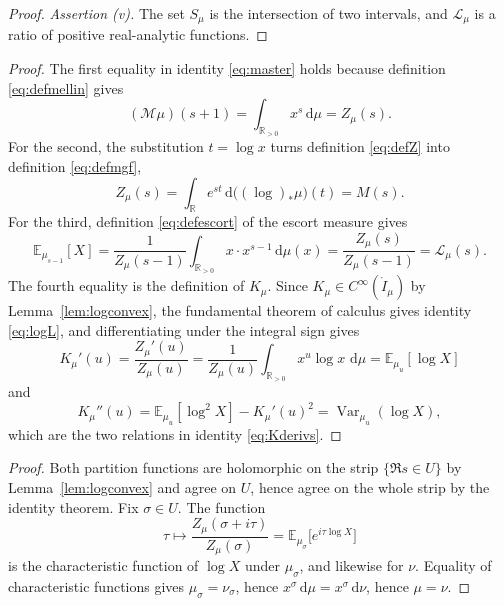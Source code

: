 \documentclass[sn-mathphys-num]{sn-jnl}
\theoremstyle{thmstyleone}%
\theoremstyle{thmstyletwo}%
\theoremstyle{thmstylethree}%
\theoremstyle{thmstyleone}%
\providecommand{\R}{\mathbb{R}}
\providecommand{\E}{\mathbb{E}}
\providecommand{\Var}{\operatorname{Var}}
\providecommand{\Rpos}{\mathbb{R}_{>0}}
\providecommand{\Leh}{\mathscr{L}}
\providecommand{\Mellin}{\mathcal{M}}
\providecommand{\dd}{\,\mathrm{d}}
\begin{document}
\begin{appendices}
\begin{proof}
			\emph{Assertion (v).} The set $S_\mu$ is the intersection of two
			intervals, and $\Leh_\mu$ is a ratio of positive real-analytic
			functions.
		\end{proof}
		\propmaster*
		
		\begin{proof}
			The first equality in identity \eqref{eq:master} holds because
			definition \eqref{eq:defmellin} gives
			\begin{equation}\label{eq:mellinshift}
				(\Mellin\mu)(s+1)=\int_{\Rpos}x^{s}\dd\mu=Z_\mu(s).
			\end{equation}
			For the second, the substitution $t=\log x$ turns
			definition \eqref{eq:defZ} into definition \eqref{eq:defmgf},
			\begin{equation}\label{eq:logpush}
				Z_\mu(s)=\int_{\R}e^{st}\dd\bigl((\log)_*\mu\bigr)(t)=M(s).
			\end{equation}
			For the third, definition \eqref{eq:defescort} of the escort
			measure gives
			\begin{equation}\label{eq:escortmean}
				\E_{\mu_{s-1}}[X]
				=\frac{1}{Z_\mu(s-1)}\int_{\Rpos}x\cdot x^{s-1}\dd\mu(x)
				=\frac{Z_\mu(s)}{Z_\mu(s-1)}=\Leh_\mu(s).
			\end{equation}
			The fourth equality is the definition of $K_\mu$. Since
			$K_\mu\in C^\infty(\mathring I_\mu)$ by
			Lemma~\ref{lem:logconvex}, the fundamental theorem of calculus
			gives identity \eqref{eq:logL}, and differentiating under the
			integral sign gives
			\begin{equation}\label{eq:Kprime}
				K_\mu'(u)=\frac{Z_\mu'(u)}{Z_\mu(u)}
				=\frac{1}{Z_\mu(u)}\int_{\Rpos} x^{u}\log x\,\dd\mu
				=\E_{\mu_u}[\log X]
			\end{equation}
			and
			\begin{equation}\label{eq:Kdoubleprime}
				K_\mu''(u)=\E_{\mu_u}[\log^2X]-K_\mu'(u)^2
				=\Var_{\mu_u}(\log X),
			\end{equation}
			which are the two relations in identity \eqref{eq:Kderivs}.
		\end{proof}
		
		\lemstrip*
		
		\begin{proof}
			Both partition functions are holomorphic on the strip
			$\{\Re s\in U\}$ by Lemma~\ref{lem:logconvex} and agree on $U$,
			hence agree on the whole strip by the identity theorem. Fix
			$\sigma\in U$. The function
			\begin{equation}\label{eq:cfnormalized}
				\tau\longmapsto\frac{Z_\mu(\sigma+i\tau)}{Z_\mu(\sigma)}
				=\E_{\mu_\sigma}\bigl[e^{i\tau\log X}\bigr]
			\end{equation}
			is the characteristic function of $\log X$ under $\mu_\sigma$, and
			likewise for $\nu$. Equality of characteristic functions gives
			$\mu_\sigma=\nu_\sigma$, hence
			$x^{\sigma}\dd\mu=x^{\sigma}\dd\nu$, hence $\mu=\nu$.
		\end{proof}
		

\end{appendices}
\end{document}
